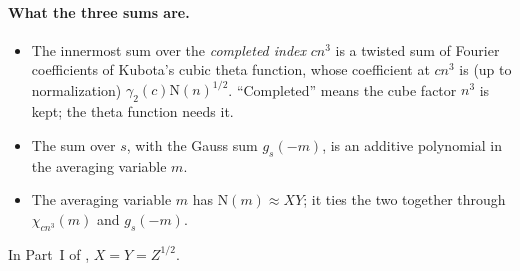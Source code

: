 \documentclass[11pt]{article}
\newcommand{\N}{\mathrm N}
\begin{document}
\paragraph{What the three sums are.}
\begin{itemize}
\item The innermost sum over the \emph{completed index} $cn^3$ is a twisted
 sum of Fourier coefficients of Kubota's cubic theta function, whose
 coefficient at $cn^3$ is (up to normalization) $\gamma_2(c)\N(n)^{1/2}$.
 ``Completed'' means the cube factor $n^3$ is kept; the theta function
 needs it.
\item The sum over $s$, with the Gauss sum $g_s(-m)$, is an additive
 polynomial in the averaging variable $m$.
\item The averaging variable $m$ has $\N(m)\approx XY$; it ties the two
 together through $\chi_{cn^3}(m)$ and $g_s(-m)$.
\end{itemize}
In Part~I of \cite{OAI78}, $X=Y=Z^{1/2}$.
\end{document}
